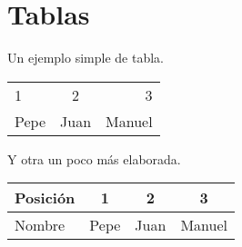 \chapter{Tablas} 

Un ejemplo simple de tabla.

\begin{tabular}{lcr}
1 & 2 & 3 \\
Pepe & Juan & Manuel
\end{tabular}

Y otra un poco más elaborada.

\begin{tabular}{l||c|c|c|} \hline
Posición & 1 & 2 & 3 \\ \hline \hline
Nombre & Pepe & Juan & Manuel\\ \hline
\end{tabular}

